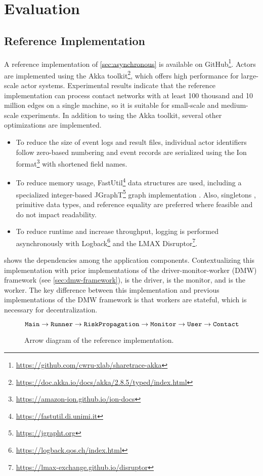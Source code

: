 \chapter{Evaluation}\label{ch:evaluation}

\section{Reference Implementation}

A reference implementation of \cref{sec:asynchronous} is available on GitHub\footnote{\url{https://github.com/cwru-xlab/sharetrace-akka}}. Actors are implemented using the Akka toolkit\footnote{\url{https://doc.akka.io/docs/akka/2.8.5/typed/index.html}}, which offers high performance for large-scale actor systems. Experimental results indicate that the reference implementation can process contact networks with at least 100 thousand \verticesName and 10 million edges on a single machine, so it is suitable for small-scale and medium-scale experiments. In addition to using the Akka toolkit, several other optimizations are implemented.
\begin{itemize}
  \item To reduce the size of event logs and result files, individual actor identifiers follow zero-based numbering and event records are serialized using the Ion format\footnote{\url{https://amazon-ion.github.io/ion-docs}} with shortened field names.
  \item To reduce memory usage, FastUtil\footnote{\url{https://fastutil.di.unimi.it}} data structures are used, including a specialized integer-based JGraphT\footnote{\url{https://jgrapht.org}} graph implementation \citep{Michail2020}. Also, singletons \citep{Gamma1995}, primitive data types, and reference equality are preferred where feasible and do not impact readability.
  \item To reduce runtime and increase throughput, logging is performed asynchronously with Logback\footnote{\url{https://logback.qos.ch/index.html}} and the LMAX Disruptor\footnote{\url{https://lmax-exchange.github.io/disruptor}}.
\end{itemize}

 shows the dependencies among the application components. Contextualizing this implementation with prior implementations of the driver-monitor-worker (DMW) framework (see \cref{sec:dmw-framework}),  is the driver,  is the monitor, and  is the worker. The key difference between this implementation and previous implementations of the DMW framework is that workers are stateful, which is necessary for decentralization.
\begin{figure}[h]
\begin{equation*}
  \texttt{Main} \rightarrow \texttt{Runner} \rightarrow \texttt{RiskPropagation} \rightarrow \texttt{Monitor} \rightarrow \texttt{User} \rightarrow \texttt{Contact}
\end{equation*}
\caption[Arrow diagram of the reference implementation]{Arrow diagram of the reference implementation.}
\label{fig:arrow-diagram}
\end{figure}


